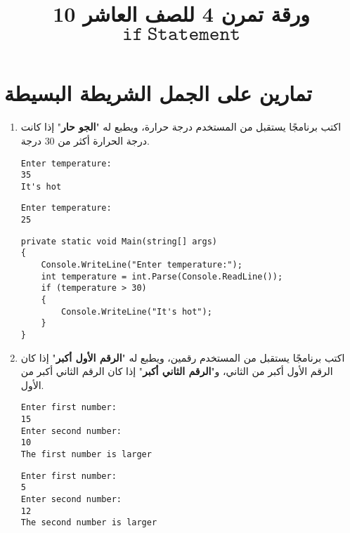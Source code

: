 \documentclass[12pt]{article}
\title{ورقة تمرن 4 للصف العاشر 10 $\mathtt{if\ Statement}$}
\begin{document}
\maketitle
\thispagestyle{fancy}

\section{تمارين على الجمل الشريطة البسيطة}


\ifdetailed
\begin{enumerate}[itemsep=3em]
\else
\begin{enumerate}
\fi

\item
اكتب برنامجًا يستقبل من المستخدم درجة حرارة، ويطبع له "\textbf{الجو حار}" إذا كانت درجة الحرارة أكثر من 30 درجة.
\ifdetailed
\begin{example}[1]
\begin{english}
\begin{lstlisting}
Enter temperature:
35
It's hot
\end{lstlisting}
\end{english}
\end{example}
\begin{example}[2]
\begin{english}
\begin{lstlisting}
Enter temperature:
25
\end{lstlisting}
\end{english}
\end{example}

\ifwithsols
\begin{solution}
\begin{english}
\begin{lstlisting}
private static void Main(string[] args)
{
    Console.WriteLine("Enter temperature:");
    int temperature = int.Parse(Console.ReadLine());
    if (temperature > 30)
    {
        Console.WriteLine("It's hot");
    }
}
\end{lstlisting}
\end{english}
\end{solution}
\clearpage
\fi
\fi

\item
اكتب برنامجًا يستقبل من المستخدم رقمين، ويطبع له "\textbf{الرقم الأول أكبر}" إذا كان الرقم الأول أكبر من الثاني، و"\textbf{الرقم الثاني أكبر}" إذا كان الرقم الثاني أكبر من الأول.
\ifdetailed
\begin{example}[1]
\begin{english}
\begin{lstlisting}
Enter first number:
15
Enter second number:
10
The first number is larger
\end{lstlisting}
\end{english}
\end{example}
\begin{example}[2]
\begin{english}
\begin{lstlisting}
Enter first number:
5
Enter second number:
12
The second number is larger
\end{lstlisting}
\end{english}
\end{example}


\end{enumerate}
\end{enumerate}
\end{document}
